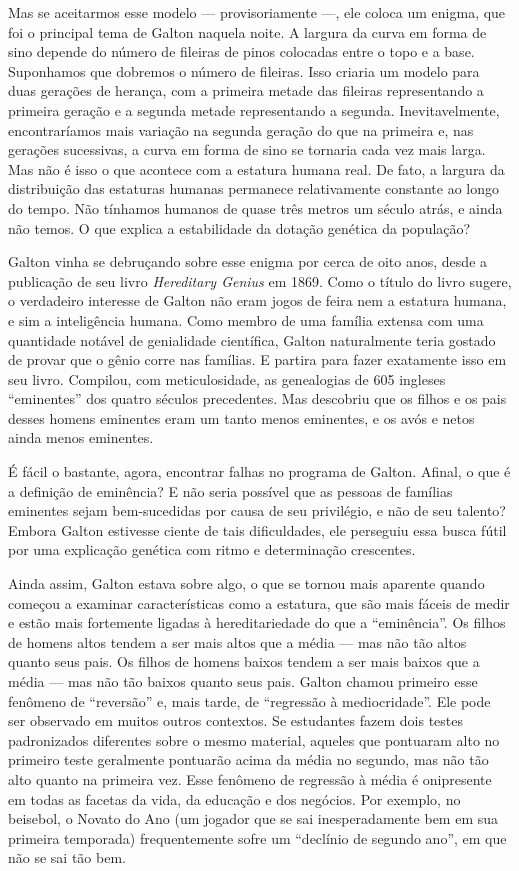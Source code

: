 \documentclass[11pt,a5paper,twoside]{book}
\begin{document}
Mas se aceitarmos esse modelo — provisoriamente —, ele coloca um enigma, que foi o principal tema de Galton naquela noite. A largura da curva em forma de sino depende do número de fileiras de pinos colocadas entre o topo e a base. Suponhamos que dobremos o número de fileiras. Isso criaria um modelo para duas gerações de herança, com a primeira metade das fileiras representando a primeira geração e a segunda metade representando a segunda. Inevitavelmente, encontraríamos mais variação na segunda geração do que na primeira e, nas gerações sucessivas, a curva em forma de sino se tornaria cada vez mais larga. Mas não é isso o que acontece com a estatura humana real. De fato, a largura da distribuição das estaturas humanas permanece relativamente constante ao longo do tempo. Não tínhamos humanos de quase três metros um século atrás, e ainda não temos. O que explica a estabilidade da dotação genética da população?

Galton vinha se debruçando sobre esse enigma por cerca de oito anos, desde a publicação de seu livro \textit{Hereditary Genius} em 1869. Como o título do livro sugere, o verdadeiro interesse de Galton não eram jogos de feira nem a estatura humana, e sim a inteligência humana. Como membro de uma família extensa com uma quantidade notável de genialidade científica, Galton naturalmente teria gostado de provar que o gênio corre nas famílias. E partira para fazer exatamente isso em seu livro. Compilou, com meticulosidade, as genealogias de 605 ingleses “eminentes” dos quatro séculos precedentes. Mas descobriu que os filhos e os pais desses homens eminentes eram um tanto menos eminentes, e os avós e netos ainda menos eminentes.

É fácil o bastante, agora, encontrar falhas no programa de Galton. Afinal, o que é a definição de eminência? E não seria possível que as pessoas de famílias eminentes sejam bem-sucedidas por causa de seu privilégio, e não de seu talento? Embora Galton estivesse ciente de tais dificuldades, ele perseguiu essa busca fútil por uma explicação genética com ritmo e determinação crescentes.

Ainda assim, Galton estava sobre algo, o que se tornou mais aparente quando começou a examinar características como a estatura, que são mais fáceis de medir e estão mais fortemente ligadas à hereditariedade do que a “eminência”. Os filhos de homens altos tendem a ser mais altos que a média — mas não tão altos quanto seus pais. Os filhos de homens baixos tendem a ser mais baixos que a média — mas não tão baixos quanto seus pais. Galton chamou primeiro esse fenômeno de “reversão” e, mais tarde, de “regressão à mediocridade”. Ele pode ser observado em muitos outros contextos. Se estudantes fazem dois testes padronizados diferentes sobre o mesmo material, aqueles que pontuaram alto no primeiro teste geralmente pontuarão acima da média no segundo, mas não tão alto quanto na primeira vez. Esse fenômeno de regressão à média é onipresente em todas as facetas da vida, da educação e dos negócios. Por exemplo, no beisebol, o Novato do Ano (um jogador que se sai inesperadamente bem em sua primeira temporada) frequentemente sofre um “declínio de segundo ano”, em que não se sai tão bem.
\end{document}
